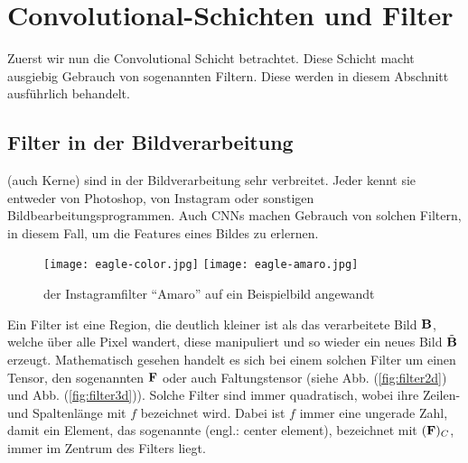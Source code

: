 \para{}
\cite{Goodfellow-et-al-2016}
\cite{deeplearning.ai:cnn}
\cite{wiki:cnn}


\section{Convolutional-Schichten und Filter}
Zuerst wir nun die Convolutional Schicht betrachtet. Diese Schicht macht ausgiebig
Gebrauch von sogenannten Filtern. Diese werden in diesem Abschnitt ausführlich behandelt.

\subsection{Filter in der Bildverarbeitung}
 (auch Kerne) sind in der Bildverarbeitung sehr verbreitet. Jeder kennt sie entweder
von Photoshop, von Instagram oder sonstigen Bildbearbeitungsprogrammen.
Auch CNNs machen Gebrauch von solchen Filtern, in diesem Fall, um die Features eines Bildes zu
erlernen.

\begin{figure}[h!]
  \centering
  \texttt{[image: eagle-color.jpg]}
  \texttt{[image: eagle-amaro.jpg]}
  \caption{der Instagramfilter ``Amaro'' auf ein Beispielbild angewandt \cite{res:eagle_image}}
\end{figure}

\para{}
Ein Filter ist eine Region, die deutlich kleiner ist als das verarbeitete Bild
$\mathbf{B}$, welche über alle Pixel wandert, diese manipuliert und so wieder ein neues Bild
$\tilde{\mathbf{B}}$ erzeugt.
Mathematisch gesehen handelt es sich bei einem solchen Filter um einen Tensor,
den sogenannten  $\mathbf{F}$ oder auch Faltungstensor (siehe Abb.
(\ref{fig:filter2d}) und Abb. (\ref{fig:filter3d})). Solche Filter sind immer quadratisch, wobei ihre
Zeilen- und Spaltenlänge mit $f$ bezeichnet wird. Dabei ist $f$ immer eine ungerade Zahl, damit ein
Element, das sogenannte  (engl.: center element), bezeichnet mit $(\mathbf{F})_C$,
immer im Zentrum des Filters liegt. \\


